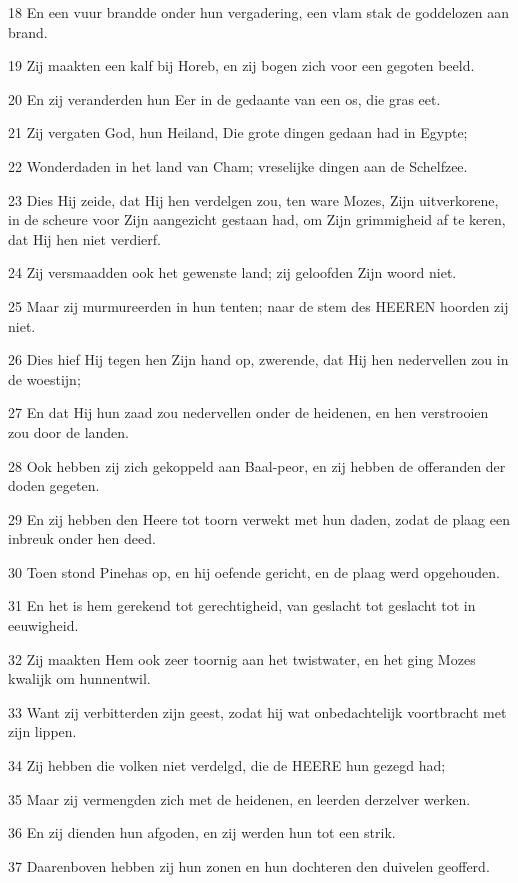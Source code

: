 \par 18 En een vuur brandde onder hun vergadering, een vlam stak de goddelozen aan brand.
\par 19 Zij maakten een kalf bij Horeb, en zij bogen zich voor een gegoten beeld.
\par 20 En zij veranderden hun Eer in de gedaante van een os, die gras eet.
\par 21 Zij vergaten God, hun Heiland, Die grote dingen gedaan had in Egypte;
\par 22 Wonderdaden in het land van Cham; vreselijke dingen aan de Schelfzee.
\par 23 Dies Hij zeide, dat Hij hen verdelgen zou, ten ware Mozes, Zijn uitverkorene, in de scheure voor Zijn aangezicht gestaan had, om Zijn grimmigheid af te keren, dat Hij hen niet verdierf.
\par 24 Zij versmaadden ook het gewenste land; zij geloofden Zijn woord niet.
\par 25 Maar zij murmureerden in hun tenten; naar de stem des HEEREN hoorden zij niet.
\par 26 Dies hief Hij tegen hen Zijn hand op, zwerende, dat Hij hen nedervellen zou in de woestijn;
\par 27 En dat Hij hun zaad zou nedervellen onder de heidenen, en hen verstrooien zou door de landen.
\par 28 Ook hebben zij zich gekoppeld aan Baal-peor, en zij hebben de offeranden der doden gegeten.
\par 29 En zij hebben den Heere tot toorn verwekt met hun daden, zodat de plaag een inbreuk onder hen deed.
\par 30 Toen stond Pinehas op, en hij oefende gericht, en de plaag werd opgehouden.
\par 31 En het is hem gerekend tot gerechtigheid, van geslacht tot geslacht tot in eeuwigheid.
\par 32 Zij maakten Hem ook zeer toornig aan het twistwater, en het ging Mozes kwalijk om hunnentwil.
\par 33 Want zij verbitterden zijn geest, zodat hij wat onbedachtelijk voortbracht met zijn lippen.
\par 34 Zij hebben die volken niet verdelgd, die de HEERE hun gezegd had;
\par 35 Maar zij vermengden zich met de heidenen, en leerden derzelver werken.
\par 36 En zij dienden hun afgoden, en zij werden hun tot een strik.
\par 37 Daarenboven hebben zij hun zonen en hun dochteren den duivelen geofferd.

